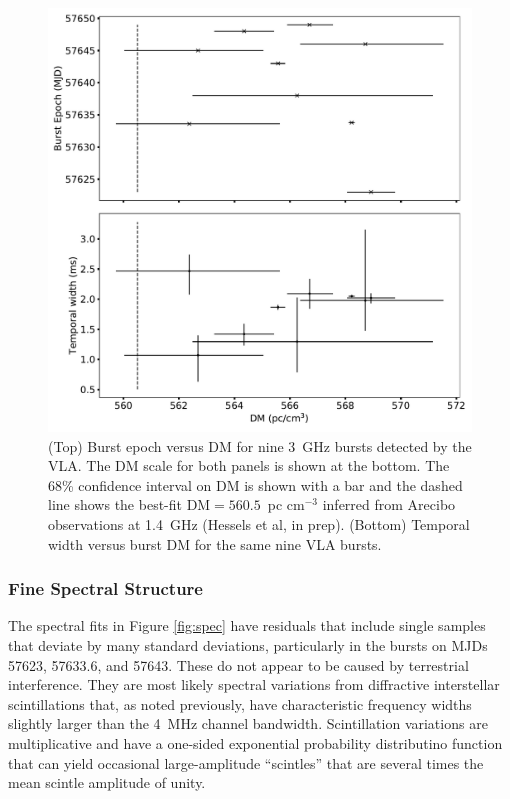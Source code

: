 \documentclass[twocolumn]{aastex61}
\begin{document}
\begin{figure}[htb]
\begin{center}
\includegraphics[width=\columnwidth]{burst_dmdt.pdf}
\caption{(Top) Burst epoch versus DM for nine 3~GHz bursts detected by the VLA. The DM scale for both panels is shown at the bottom. The 68\% confidence interval on DM is shown with a bar and the dashed line shows the best-fit DM$=560.5$\ pc cm$^{-3}$ inferred from Arecibo observations at 1.4~GHz (Hessels et al, in prep). (Bottom) Temporal width versus burst DM for the same nine VLA bursts.
\label{fig:dmdt}}
\end{center}
\end{figure}

\subsubsection{Fine Spectral Structure}

The spectral fits in Figure \ref{fig:spec} have residuals that include single samples that deviate by many standard deviations, particularly in the bursts on MJDs 57623,  57633.6, and 57643. These do not appear to be caused by terrestrial interference. They are most likely spectral variations from diffractive interstellar scintillations that, as noted previously, have characteristic frequency widths slightly larger than the 4~MHz channel bandwidth.  Scintillation variations are multiplicative and have a one-sided exponential probability distributino function that can yield occasional large-amplitude ``scintles'' that are several times the mean scintle amplitude of unity.
\end{document}
